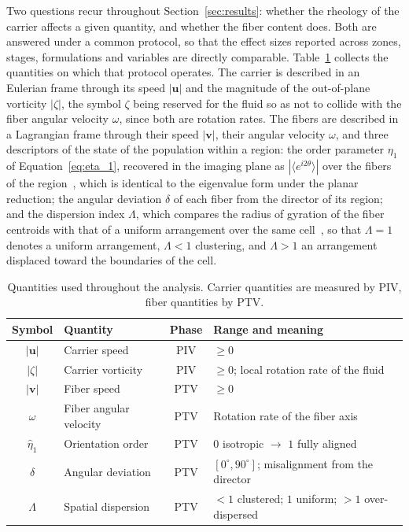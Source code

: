 \documentclass[%
  aip,
  pof,          %
  reprint,      %
  floatfix
]{revtex4-2}
\begin{document}
Two questions recur throughout Section~\ref{sec:results}: whether the rheology of the carrier affects a given quantity, and whether the fiber content does. Both are answered under a common protocol, so that the effect sizes reported across zones, stages, formulations and variables are directly comparable. Table~\ref{tab:quantities} collects the quantities on which that protocol operates. The carrier is described in an Eulerian frame through its speed $|\bm{u}|$ and the magnitude of the out-of-plane vorticity $|\zeta|$, the symbol $\zeta$ being reserved for the fluid so as not to collide with the fiber angular velocity $\omega$, since both are rotation rates. The fibers are described in a Lagrangian frame through their speed $|\bm{v}|$, their angular velocity $\omega$, and three descriptors of the state of the population within a region: the order parameter $\eta_1$ of Equation~\eqref{eq:eta_1}, recovered in the imaging plane as $|\langle e^{i2\theta}\rangle|$ over the fibers of the region~\cite{mardia2000directional}, which is identical to the eigenvalue form under the planar reduction; the angular deviation $\delta$ of each fiber from the director of its region; and the dispersion index $\Lambda$, which compares the radius of gyration of the fiber centroids with that of a uniform arrangement over the same cell~\cite{baddeley2015spatial}, so that $\Lambda = 1$ denotes a uniform arrangement, $\Lambda < 1$ clustering, and $\Lambda > 1$ an arrangement displaced toward the boundaries of the cell.

\begin{table}[htb]
\centering
\caption{Quantities used throughout the analysis. Carrier quantities are measured by PIV, fiber quantities by PTV.}
\label{tab:quantities}
\begin{tabular}{c l c l}
\toprule
\textbf{Symbol} & \textbf{Quantity} & \textbf{Phase} & \textbf{Range and meaning} \\
\midrule
$|\bm{u}|$ & Carrier speed          & PIV & $\geq 0$ \\
$|\zeta|$  & Carrier vorticity      & PIV & $\geq 0$; local rotation rate of the fluid \\
$|\bm{v}|$ & Fiber speed            & PTV & $\geq 0$ \\
$\omega$   & Fiber angular velocity & PTV & Rotation rate of the fiber axis \\
$\hat{\eta}_1$ & Orientation order  & PTV & $0$ isotropic $\rightarrow$ $1$ fully aligned \\
$\delta$   & Angular deviation      & PTV & $[0^\circ,90^\circ]$; misalignment from the director \\
$\Lambda$  & Spatial dispersion     & PTV & $<1$ clustered; $1$ uniform; $>1$ over-dispersed \\
\bottomrule
\end{tabular}
\end{table}
\end{document}
